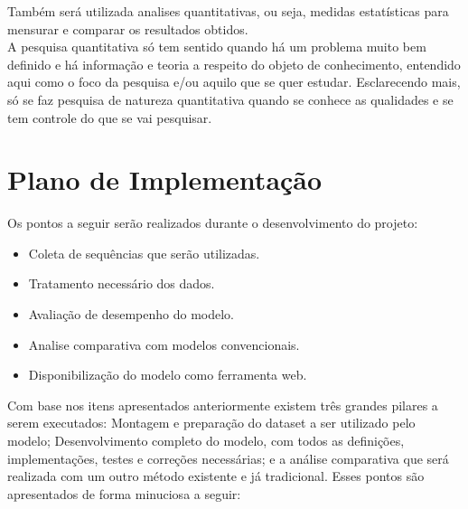 Também será utilizada analises quantitativas, ou seja, medidas estatísticas para mensurar e comparar os resultados obtidos.\\
A pesquisa quantitativa só tem sentido quando há um problema muito bem definido e há informação e teoria a respeito do objeto de conhecimento, entendido aqui como o foco da pesquisa e/ou aquilo que se quer estudar. Esclarecendo mais, só se faz pesquisa de natureza quantitativa quando se conhece as qualidades e se tem controle do que se vai pesquisar.\cite{da_silva_pesquisa_2014}

\section{Plano de Implementação}

Os pontos a seguir serão realizados durante o desenvolvimento do projeto:

\begin{itemize}
  \item Coleta de sequências que serão utilizadas.
  \item Tratamento necessário dos dados.
  \item Avaliação de desempenho do modelo.
  \item Analise comparativa com modelos convencionais.
  \item Disponibilização do modelo como ferramenta web.
\end{itemize}

Com base nos itens apresentados anteriormente existem três grandes pilares a serem executados: Montagem e preparação do dataset a ser utilizado pelo modelo; Desenvolvimento completo do modelo, com todos as definições, implementações, testes e correções necessárias; e a análise comparativa que será realizada com um outro método existente e já tradicional. Esses pontos são apresentados de forma minuciosa a seguir:

